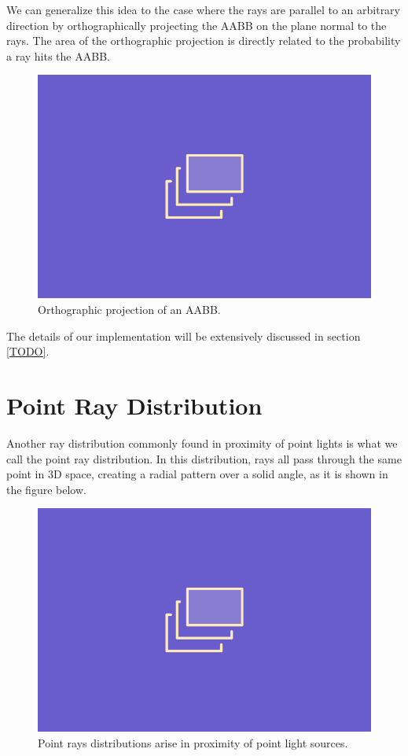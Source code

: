 \documentclass{PoliMi_MasterThesis}
\begin{document}
We can generalize this idea to the case where the rays are parallel to an arbitrary direction by orthographically projecting the AABB on the plane normal to the rays. The area of the orthographic projection is directly related to the probability a ray hits the AABB.

\begin{figure}[H]
    \centering
    \includegraphics[width=\textwidth*\real{0.5}]{Images/TODO.png}
    \caption{Orthographic projection of an AABB.}
    \label{fig:aabb_ortho_projection}
\end{figure}

The details of our implementation will be extensively discussed in section \ref{TODO}.

\section{Point Ray Distribution} \label{sec:point_ray_distribution}
Another ray distribution commonly found in proximity of point lights is what we call the point ray distribution. In this distribution, rays all pass through the same point in 3D space, creating a radial pattern over a solid angle, as it is shown in the figure below.

\begin{figure}[H]
    \centering
    \includegraphics[width=\textwidth*\real{0.5}]{Images/TODO.png}
    \caption{Point rays distributions arise in proximity of point light sources.}
    \label{fig:point_rays_distribution}
\end{figure}
\end{document}
